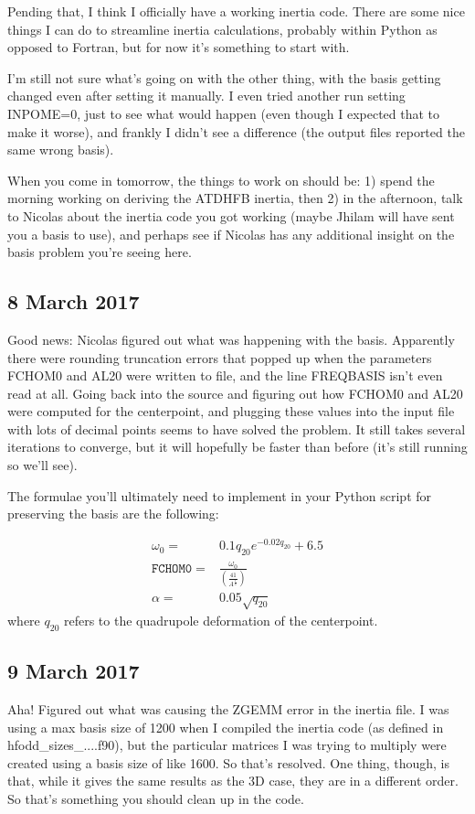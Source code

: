 \documentclass[]{report}
\begin{document}
Pending that, I think I officially have a working inertia code. There are some nice things I can do to streamline inertia calculations, probably within Python as opposed to Fortran, but for now it's something to start with.

I'm still not sure what's going on with the other thing, with the basis getting changed even after setting it manually. I even tried another run setting INPOME=0, just to see what would happen (even though I expected that to make it worse), and frankly I didn't see a difference (the output files reported the same wrong basis).

When you come in tomorrow, the things to work on should be: 1) spend the morning working on deriving the ATDHFB inertia, then 2) in the afternoon, talk to Nicolas about the inertia code you got working (maybe Jhilam will have sent you a basis to use), and perhaps see if Nicolas has any additional insight on the basis problem you're seeing here.

\subsection*{8 March 2017}
Good news: Nicolas figured out what was happening with the basis. Apparently there were rounding truncation errors that popped up when the parameters FCHOM0 and AL20 were written to file, and the line FREQBASIS isn't even read at all. Going back into the source and figuring out how FCHOM0 and AL20 were computed for the centerpoint, and plugging these values into the input file with lots of decimal points seems to have solved the problem. It still takes several iterations to converge, but it will hopefully be faster than before (it's still running so we'll see).

The formulae you'll ultimately need to implement in your Python script for preserving the basis are the following:

\begin{eqnarray}
\omega_0        =& 0.1q_{20}e^{-0.02q_{20}}+6.5 \\
\mathtt{FCHOM0} =& \frac{\omega_0}{\left(\frac{41}{A^\frac{1}{3}}\right)} \\
\alpha          =& 0.05\sqrt{q_{20}}
\end{eqnarray}
\noindent where $q_{20}$ refers to the quadrupole deformation of the centerpoint.

\subsection*{9 March 2017}
Aha! Figured out what was causing the ZGEMM error in the inertia file. I was using a max basis size of 1200 when I compiled the inertia code (as defined in hfodd\_sizes\_....f90), but the particular matrices I was trying to multiply were created using a basis size of like 1600. So that's resolved. One thing, though, is that, while it gives the same results as the 3D case, they are in a different order. So that's something you should clean up in the code. 
\end{document}
